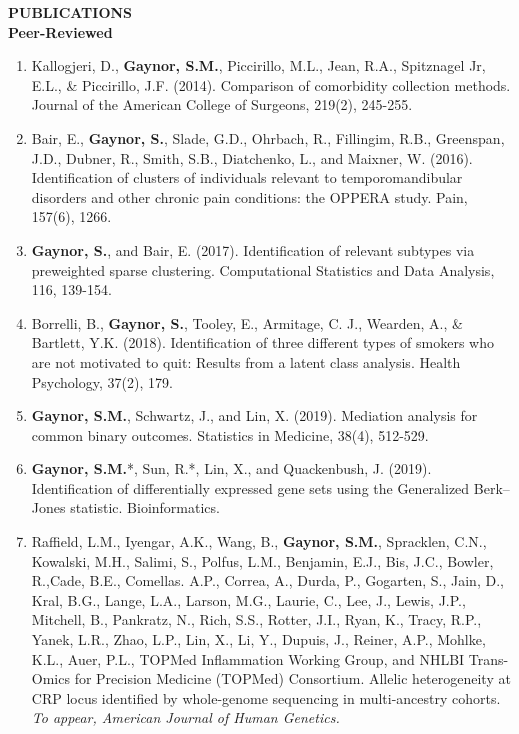 \documentclass[10pt]{article}
\begin{document}

{ \bf PUBLICATIONS} \hrulefill \\

\indent \textbf{Peer-Reviewed} \\
\begin{enumerate}
\item Kallogjeri, D., \textbf{Gaynor, S.M.}, Piccirillo, M.L., Jean, R.A., Spitznagel Jr, E.L., \& Piccirillo, J.F. (2014). Comparison of comorbidity collection methods. Journal of the American College of Surgeons, 219(2), 245-255.
\item Bair, E., \textbf{Gaynor, S.}, Slade, G.D., Ohrbach, R., Fillingim, R.B., Greenspan, J.D., Dubner, R., Smith, S.B., Diatchenko, L., and Maixner, W. (2016). Identification of clusters of individuals relevant to temporomandibular disorders and other chronic pain conditions: the OPPERA study. Pain, 157(6), 1266.
\item \textbf{Gaynor, S.}, and Bair, E. (2017). Identification of relevant subtypes via preweighted sparse clustering. Computational Statistics and Data Analysis, 116, 139-154.
\item Borrelli, B., \textbf{Gaynor, S.}, Tooley, E., Armitage, C. J., Wearden, A., \& Bartlett, Y.K. (2018). Identification of three different types of smokers who are not motivated to quit: Results from a latent class analysis. Health Psychology, 37(2), 179.
\item \textbf{Gaynor, S.M.}, Schwartz, J., and Lin, X. (2019). Mediation analysis for common binary outcomes. Statistics in Medicine, 38(4), 512-529.
\item \textbf{Gaynor, S.M.}*, Sun, R.*, Lin, X., and Quackenbush, J. (2019). Identification of differentially expressed gene sets using the Generalized Berk–Jones statistic. Bioinformatics.
\item Raffield, L.M.,  Iyengar, A.K.,  Wang, B.,  \textbf{Gaynor, S.M.}, Spracklen, C.N., Kowalski, M.H., Salimi, S., Polfus, L.M., Benjamin, E.J., Bis, J.C., Bowler, R.,Cade, B.E., Comellas. A.P.,  Correa, A.,  Durda, P.,  Gogarten, S.,  Jain, D., Kral, B.G., Lange, L.A.,  Larson, M.G.,  Laurie, C., Lee, J., Lewis, J.P., Mitchell, B.,  Pankratz, N.,  Rich, S.S., Rotter, J.I., Ryan, K., Tracy, R.P., Yanek, L.R.,  Zhao, L.P., Lin, X., Li, Y., Dupuis, J., Reiner, A.P., Mohlke, K.L., Auer, P.L., TOPMed Inflammation Working Group, and NHLBI Trans-Omics for Precision Medicine (TOPMed) Consortium. Allelic heterogeneity at CRP locus identified by whole-genome sequencing in multi-ancestry cohorts. \textit{To appear, American Journal of Human Genetics.} 

\end{enumerate}
\end{document}
